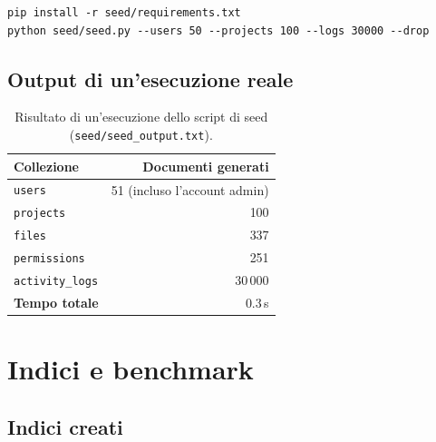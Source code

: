 \documentclass[11pt,a4paper]{article}
\begin{document}
\begin{lstlisting}
pip install -r seed/requirements.txt
python seed/seed.py --users 50 --projects 100 --logs 30000 --drop
\end{lstlisting}

\subsection{Output di un'esecuzione reale}

\begin{table}[h!]
\centering
\begin{tabular}{@{}lr@{}}
\toprule
\textbf{Collezione} & \textbf{Documenti generati} \\
\midrule
\texttt{users} & 51 (incluso l'account admin) \\
\texttt{projects} & 100 \\
\texttt{files} & 337 \\
\texttt{permissions} & 251 \\
\texttt{activity\_logs} & 30\,000 \\
\midrule
\textbf{Tempo totale} & 0.3\,s \\
\bottomrule
\end{tabular}
\caption{Risultato di un'esecuzione dello script di seed (\texttt{seed/seed\_output.txt}).}
\end{table}

\section{Indici e benchmark}

\subsection{Indici creati}
\end{document}
